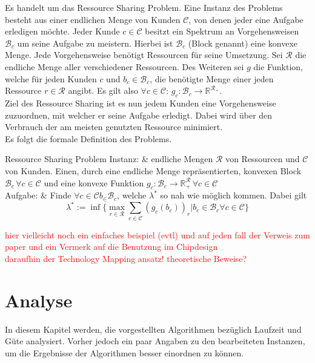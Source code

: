 \documentclass[11pt, a4paper, german]{article}
\newcommand{\TM}{Technology Mapping }
\begin{document}
Es handelt um das Ressource Sharing Problem. Eine Instanz des Problems besteht aus einer endlichen Menge von Kunden $\mathcal{C}$, von denen jeder eine Aufgabe erledigen möchte.  Jeder Kunde $c \in \mathcal{C}$ besitzt ein Spektrum an Vorgehensweisen $\mathcal{B}_c$ um seine Aufgabe zu meistern. Hierbei ist $\mathcal{B}_c$ (Block genannt) eine konvexe Menge. Jede Vorgehensweise benötigt Ressourcen für seine Umsetzung. Sei $\mathcal{R}$ die endliche  Menge aller verschiedener Ressourcen.  Des Weiteren sei $g$ die Funktion, welche für jeden Kunden $c$ und $b_c \in \mathcal{B}_c$, die benötigte Menge einer jeden Ressource $r \in \mathcal{R}$ angibt. Es gilt also $\forall c \in \mathcal{C}: \, g_c:\mathcal{B}_c \rightarrow \mathbb{R}^{\mathcal{R}_+}$. \\
Ziel des Ressource Sharing ist es nun jedem Kunden eine Vorgehensweise zuzuordnen, mit welcher er seine Aufgabe erledigt. Dabei wird über den Verbrauch der am meisten genutzten Ressource minimiert. \\
Es folgt die formale Definition des Problems. \\
\begin{problem}[framed]{Ressource Sharing Problem}
  Instanz:  & endliche Mengen $\mathcal{R}$ von Ressourcen und $\mathcal{C}$ von Kunden. Einen, durch eine endliche Menge repräsentierten,  konvexen Block $\mathcal{B}_c \, \forall c \in \mathcal{C}$ und eine konvexe Funktion $g_c: \mathcal{B}_c \rightarrow \mathbb{R}^{\mathcal{R}}_+ \, \forall c \in \mathcal{C}$\\
  Aufgabe: & Finde $\forall c \in \mathcal{C} b_ \in \mathcal{B}_c$, welche $\lambda ^*$ so nah wie möglich kommen. Dabei gilt \[\lambda^* := \inf \{ \max\limits_{r \in \mathcal{R}} \sum\limits_{c \in \mathcal{C}}  (g_c(b_c))_r | b_c \in \mathcal{B}_c \forall c \in \mathcal{C} \}\]
\end{problem}
\textcolor{red}{hier vielleicht noch ein einfaches beispiel (evtl) und auf jeden fall der Verweis zum paper und ein Vermerk auf die Benutzung im Chipdesign \\ daraufhin der \TM ansatz! theoretische Beweise?}


\section{Analyse}
\label{sec:analyse}
In diesem Kapitel werden, die vorgestellten Algorithmen bezüglich Laufzeit und Güte analysiert. Vorher jedoch ein paar Angaben zu den bearbeiteten Instanzen, um die Ergebnisse der Algorithmen besser einordnen zu können.
\end{document}
